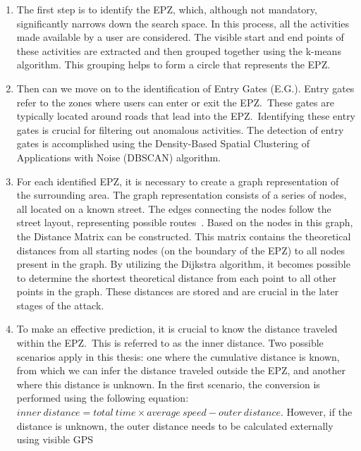 \documentclass[conference]{IEEEtran}
\begin{document}
\begin{enumerate}
    \item The first step is to identify the EPZ, which, although not mandatory,
          significantly narrows down the search space. In this process, all the
          activities made available by a user are considered. The visible start and end
          points of these activities are extracted and then grouped together using the
          k-means algorithm. This grouping helps to form a circle that represents the
          EPZ.\
    \item Then can we move on to the identification of Entry Gates (E.G.). Entry gates
          refer to the zones where users can enter or exit the EPZ.\ These gates are
          typically located around roads that lead into the EPZ.\ Identifying these entry
          gates is crucial for filtering out anomalous activities. The detection of entry
          gates is accomplished using the Density-Based Spatial Clustering of
          Applications with Noise (DBSCAN) algorithm.
    \item For each identified EPZ, it is necessary to create a graph representation of
          the surrounding area. The graph representation consists of a series of nodes,
          all located on a known street. The edges connecting the nodes follow the street
          layout, representing possible routes~\cite{neira2022graph}. Based on the nodes
          in this graph, the Distance Matrix can be constructed. This matrix contains the
          theoretical distances from all starting nodes (on the boundary of the EPZ) to
          all nodes present in the graph. By utilizing the Dijkstra algorithm, it becomes
          possible to determine the shortest theoretical distance from each point to all
          other points in the graph. These distances are stored and are crucial in the
          later stages of the attack.
    \item To make an effective prediction, it is crucial to know the distance traveled
          within the EPZ.\ This is referred to as the inner distance. Two possible
          scenarios apply in this thesis: one where the cumulative distance is known,
          from which we can infer the distance traveled outside the EPZ, and another
          where this distance is unknown. In the first scenario, the conversion is
          performed using the following equation: $inner\ distance = total\ time \times
              average\ speed - outer\ distance \label{eq:inner}$. However, if the distance is
          unknown, the outer distance needs to be calculated externally using visible GPS

\end{enumerate}
\end{document}
